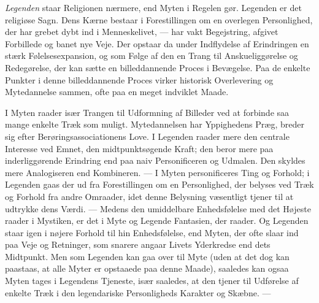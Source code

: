 \documentclass[12pt,a4paper,openany]{book}
\begin{document}
\textit{Legenden} staar Religionen nærmere, end Myten i Regelen gør.
Legenden er det religiøse Sagn. Dens Kærne bestaar i Forestillingen om
en overlegen Personlighed, der har grebet dybt ind i Menneskelivet, ---
har vakt Begejstring, afgivet Forbillede og banet nye Veje. Der opstaar
da under Indflydelse af Erindringen en stærk Følelsesexpansion, og som
Følge af den en Trang til Anskueliggørelse og Redegørelse, der kan sætte
en billeddannende Proces i Bevægelse. Paa de enkelte Punkter i denne
billeddannende Proces virker historisk Overlevering og Mytedannelse
sammen, ofte paa en meget indviklet Maade.

I Myten raader især Trangen til Udformning af Billeder ved at forbinde
saa mange enkelte Træk som muligt. Mytedannelsen har Yppighedens Præg,
breder sig efter Berøringsassociationens Love. I Legenden raader mere
den centrale Interesse ved Emnet, den midtpunktsøgende Kraft; den beror
mere paa inderliggørende Erindring end paa naiv Personificeren og
Udmalen. Den skyldes mere Analogiseren end Kombineren. --- I Myten
personificeres Ting og Forhold; i Legenden gaas der ud fra
Forestillingen om en Personlighed, der belyses ved Træk og Forhold fra
andre Omraader, idet denne Belysning væsentligt tjener til at udtrykke
dens Værdi. --- Medens den umiddelbare Enhedsfølelse med det Højeste
raader i Mystiken, er det i Myte og Legende Fantasien, der raader. Og
Legenden staar igen i nøjere Forhold til hin Enhedsfølelse, end Myten,
der ofte slaar ind paa Veje og Retninger, som snarere angaar Livets
Yderkredse end dets Midtpunkt. Men som Legenden kan gaa over til Myte
(uden at det dog kan paastaas, at alle Myter er opstaaede paa denne
Maade), saaledes kan ogsaa Myten tages i Legendens Tjeneste, især
saaledes, at den tjener til Udførelse af enkelte Træk i den legendariske
Personligheds Karakter og Skæbne. ---
\end{document}
